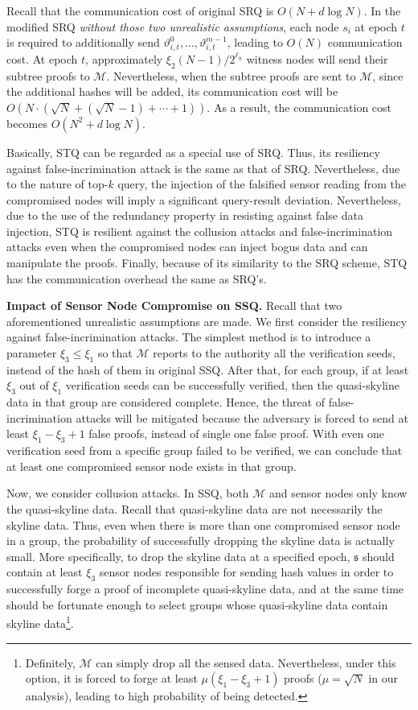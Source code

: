 \documentclass[conference]{IEEEtran}
\begin{document}
Recall that the communication cost of original SRQ is $O(N+d\log N)$. In the modified SRQ \emph{without those two unrealistic assumptions}, each node $s_i$ at epoch $t$ is required to additionally send $\vartheta_{i,t}^{0},\dots,\vartheta_{i,t}^{m-1}$, leading to $O(N)$ communication cost. At epoch $t$, approximately $\xi_2(N-1)/2^{\ell_h}$ witness nodes will send their subtree proofs to $\mathcal{M}$. Nevertheless, when the subtree proofs are sent to $\mathcal{M}$, since the additional hashes will be added, its communication cost will be $O(N\cdot (\sqrt{N}+(\sqrt{N}-1)+\cdots+1))$. As a result, the communication cost becomes $O(N^2+d\log N)$.

Basically, STQ can be regarded as a special use of SRQ. Thus, its resiliency against false-incrimination attack is the same as that of SRQ. Nevertheless, due to the nature of top-$k$ query, the injection of the falsified sensor reading from the compromised nodes will imply a significant query-result deviation. Nevertheless, due to the use of the redundancy property in resisting against false data injection, STQ is resilient against the collusion attacks and false-incrimination attacks even when the compromised nodes can inject bogus data and can manipulate the proofs. Finally, because of its similarity to the SRQ scheme, STQ has the communication overhead the same as SRQ's.  

\textbf{Impact of Sensor Node Compromise on SSQ.} Recall that two aforementioned unrealistic assumptions are made. We first consider the resiliency against false-incrimination attacks. The simplest method is to introduce a parameter $\xi_3\leq \xi_1$ so that $\mathcal{M}$ reports to the authority all the verification seeds, instead of the hash of them in original SSQ. After that, for each group, if at least $\xi_3$ out of $\xi_1$ verification seeds can be successfully verified, then the quasi-skyline data in that group are considered complete. Hence, the threat of false-incrimination attacks will be mitigated because the adversary is forced to send at least $\xi_1-\xi_3+1$ false proofs, instead of single one false proof. With even one verification seed from a specific group failed to be verified, we can conclude that at least one compromised sensor node exists in that group.

Now, we consider collusion attacks. In SSQ, both $\mathcal{M}$ and sensor nodes only know the quasi-skyline data. Recall that quasi-skyline data are not necessarily the skyline data. Thus, even when there is more than one compromised sensor node in a group, the probability of successfully dropping the skyline data is actually small. More specifically, to drop the skyline data at a specified epoch, $\mathfrak{s}$ should contain at least $\xi_3$ sensor nodes responsible for sending hash values in order to successfully forge a proof of incomplete quasi-skyline data, and at the same time should be fortunate enough to select groups whose quasi-skyline data contain skyline data\footnote{Definitely, $\mathcal{M}$ can simply drop all the sensed data. Nevertheless, under this option, it is forced to forge at least $\mu(\xi_1-\xi_3+1)$ proofs ($\mu=\sqrt{N}$ in our analysis), leading to high probability of being detected.}.
\end{document}
